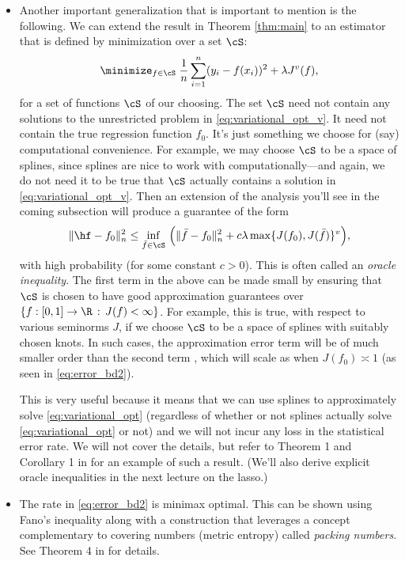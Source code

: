 \documentclass{article}
\begin{document}
\begin{itemize}
\item Another important generalization that is important to mention is the
  following. We can extend the result in Theorem \ref{thm:main} to an estimator
  that is defined by minimization over a set $\cS$:
  \[
  \minimize_{f \in \cS} \; \frac{1}{n} \sum_{i=1}^n (y_i - f(x_i))^2 + \lambda
  J^v(f),  
  \]
  for a set of functions $\cS$ of our choosing. The set $\cS$ need not contain
  any solutions to the unrestricted problem in \eqref{eq:variational_opt_v}. It 
  need not contain the true regression function $f_0$. It's just something we
  choose for (say) computational convenience. For example, we may choose $\cS$
  to be a space of splines, since splines are nice to work with
  computationally---and again, we do not need it to be true that $\cS$ actually
  contains a solution in \eqref{eq:variational_opt_v}. Then an extension of the
  analysis you'll see in the coming subsection will produce a guarantee of the
  form
  \[
  \|\hf - f_0\|_n^2 \leq \inf_{\bar{f} \in \cS} \, \Big( \|\bar{f} - f_0\|_n^2
  + c \lambda \max\{ J(f_0),  J(\bar{f}) \}^v \Big),
  \]
  with high probability (for some constant $c>0$). This is often called an 
  \emph{oracle inequality}. The first term in the above  can be made small by ensuring that $\cS$ is chosen to have good
  approximation guarantees over $\{ f : [0,1] \to \R \,:\, J(f) < \infty\}$. For
  example, this is true, with respect to various seminorms $J$, if we choose
  $\cS$ to be a space of splines with suitably chosen knots. In such cases, the 
  approximation error term  will be of much
  smaller order than the second term , which will scale as  when $J(f_0) \asymp 1$
  (as seen in \eqref{eq:error_bd2}). 

  This is very useful because it means that we can use splines to approximately
  solve \eqref{eq:variational_opt} (regardless of whether or not splines
  actually solve \eqref{eq:variational_opt} or not) and we will not incur any
  loss in the statistical error rate. We will not cover the details, but refer
  to Theorem 1 and Corollary 1 in \citet{sadhanala2019additive} for an example
  of such a result. (We'll also derive explicit oracle inequalities in the next
  lecture on the lasso.)  

\item The rate in \eqref{eq:error_bd2} is minimax optimal. This can be shown
  using Fano's inequality along with a construction that leverages a concept 
  complementary to covering numbers (metric entropy) called \emph{packing
    numbers}. See Theorem 4 in \citet{sadhanala2019additive} for details.  
\end{itemize}
\end{document}
